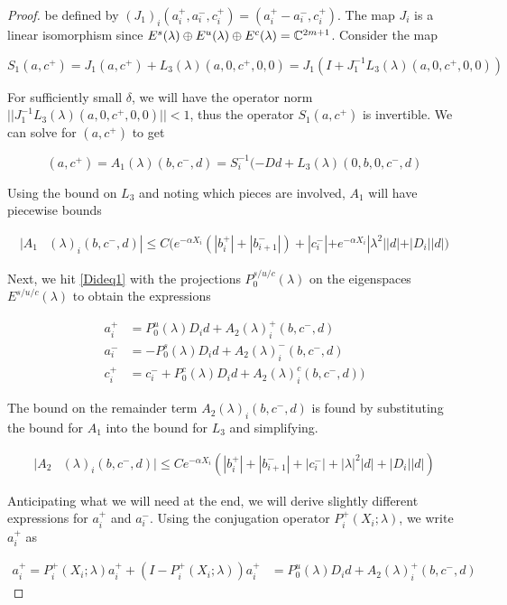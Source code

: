 \documentclass[thesis.tex]{subfiles}
\begin{document}
\begin{lemma}
\begin{proof}
be defined by $(J_1)_i(a_i^+, a_i^-, c_i^+) = (a_i^+ - a_i^-, c_i^+)$. The map $J_i$ is a linear isomorphism since $E^s(\lambda) \oplus E^u(\lambda) \oplus E^c(\lambda) = {\mathbb C}^{2m + 1}$. Consider the map

\[
S_1(a, c^+) = J_1 (a, c^+) + L_3(\lambda)(a, 0, c^+, 0, 0) = J_1( I + J_1^{-1} L_3(\lambda)(a, 0, c^+, 0, 0))
\]

For sufficiently small $\delta$, we will have the operator norm $||J_1^{-1} L_3(\lambda)(a, 0, c^+, 0, 0)|| < 1$, thus the operator $S_1(a, c^+)$ is invertible. We can solve for $(a, c^+)$ to get

\[
(a, c^+) = A_1(\lambda)(b, c^-, d) = S_i^{-1}(-D d + L_3(\lambda)(0, b, 0, c^-, d)
\]

Using the bound on $L_3$ and noting which pieces are involved, $A_1$ will have piecewise bounds

\begin{align*}
|A_1&(\lambda)_i(b, c^-, d)|
\leq C \Big( e^{-\alpha X_i} (|b_i^+| + |b_{i+1}^-|) + |c_i^-| + e^{-\alpha X_i} |\lambda^2||d| + |D_i||d| \Big)
\end{align*} 

Next, we hit \eqref{Dideq1} with the projections $P_0^{s/u/c}(\lambda)$ on the eigenspaces $E^{s/u/c}(\lambda)$ to obtain the expressions

\begin{align*}
a_i^+ &= P_0^u(\lambda) D_i d + A_2(\lambda)_i^+(b, c^-, d) \\
a_i^- &= -P_0^s(\lambda) D_i d + A_2(\lambda)_i^-(b, c^-, d) \\
c_i^+ &= c_i^- + P_0^c(\lambda) D_i d + A_2(\lambda)_i^c(b, c^-, d) )
\end{align*}

The bound on the remainder term $A_2(\lambda)_i(b, c^-, d)$ is found by substituting the bound for $A_1$ into the bound for $L_3$ and simplifying. 

\begin{align*}
|A_2&(\lambda)_i(b, c^-, d)|
\leq C e^{-\alpha X_i} \left( |b_i^+| + |b_{i+1}^-| + |c_i^-| + |\lambda|^2|d| + |D_i||d| \right)
\end{align*} 

Anticipating what we will need at the end, we will derive slightly different expressions for $a_i^+$ and $a_i^-$. Using the conjugation operator $P_i^+(X_i; \lambda)$, we write $a_i^+$ as

\begin{align*}
a_i^+ = P_i^+(X_i; \lambda)a_i^+ + (I - P_i^+(X_i; \lambda))a_i^+ &= P_0^u(\lambda) D_i d + A_2(\lambda)_i^+(b, c^-, d)
\end{align*}


\end{proof}
\end{lemma}
\end{document}
